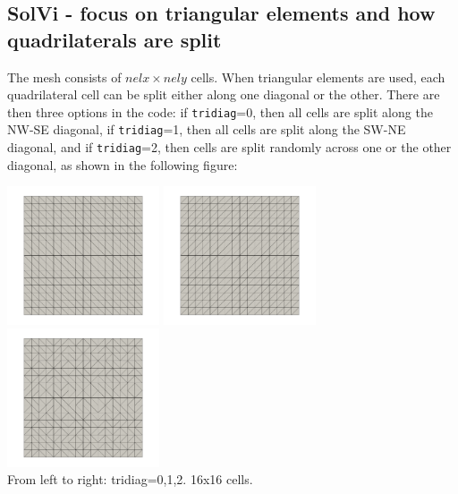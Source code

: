 \newpage
\subsection*{SolVi - focus on triangular elements and how quadrilaterals are split}
The mesh consists of $nelx \times nely$ cells. When triangular elements are used, 
each quadrilateral cell can be split either along one diagonal or the other. 
There are then three options in the code: if {\tt tridiag}=0, then all cells are split 
along the NW-SE diagonal, if {\tt tridiag}=1, then all cells are split
along the SW-NE diagonal, and if {\tt tridiag}=2, then cells are split 
randomly across one or the other diagonal, as shown in the following figure:

\begin{center}
\includegraphics[width=4.5cm]{python_codes/fieldstone_112/results/exp5_tridiag/tridiag0}
\includegraphics[width=4.5cm]{python_codes/fieldstone_112/results/exp5_tridiag/tridiag1}
\includegraphics[width=4.5cm]{python_codes/fieldstone_112/results/exp5_tridiag/tridiag2}\\
{\captionfont From left to right: tridiag=0,1,2. 16x16 cells.}
\end{center}

